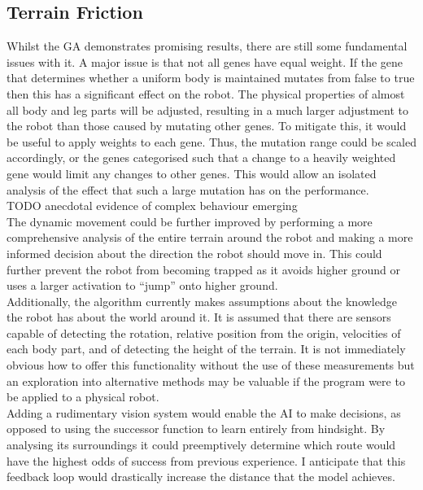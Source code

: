 \documentclass{article}
\begin{document}
\subsection{Terrain Friction}



Whilst the GA demonstrates promising results, there are still some fundamental issues with it. A major issue is that not all genes have equal weight. If the gene that determines whether a uniform body is maintained mutates from false to true then this has a significant effect on the robot. The physical properties of almost all body and leg parts will be adjusted, resulting in a much larger adjustment to the robot than those caused by mutating other genes. To mitigate this, it would be useful to apply weights to each gene. Thus, the mutation range could be scaled accordingly, or the genes categorised such that a change to a heavily weighted gene would limit any changes to other genes. This would allow an isolated analysis of the effect that such a large mutation has on the performance.\\


TODO anecdotal evidence of complex behaviour emerging\\


The dynamic movement could be further improved by performing a more comprehensive analysis of the entire terrain around the robot and making a more informed decision about the direction the robot should move in. This could further prevent the robot from becoming trapped as it avoids higher ground or uses a larger activation to “jump” onto higher ground.\\ Additionally, the algorithm currently makes assumptions about the knowledge the robot has about the world around it. It is assumed that there are sensors capable of detecting the rotation, relative position from the origin, velocities of each body part, and of detecting the height of the terrain. It is not immediately obvious how to offer this functionality without the use of these measurements but an exploration into alternative methods may be valuable if the program were to be applied to a physical robot. \\


Adding a rudimentary vision system would enable the AI to make decisions, as opposed to using the successor function to learn entirely from hindsight. By analysing its surroundings it could preemptively determine which route would have the highest odds of success from previous experience. I anticipate that this feedback loop would drastically increase the distance that the model achieves. 
\end{document}
